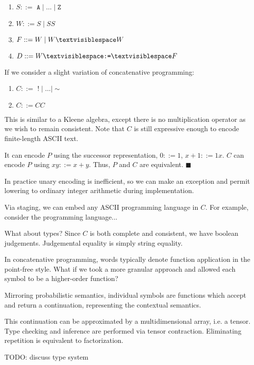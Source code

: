 \documentclass[11pt]{article}
\begin{document}
\begin{enumerate}
  \item $S ::= $ $\texttt{A} \mid \ldots \mid \texttt{Z}$
  \item $W ::= S \mid SS$
  \item $F ::= W \mid W \textvisiblespace W$
  \item $D ::= W \textvisiblespace\texttt{:=}\textvisiblespace F$
\end{enumerate}

If we consider a slight variation of concatenative programming:

\begin{enumerate}
  \item $C ::= $ $! \mid \ldots \mid \sim$
  \item $C ::= CC$
\end{enumerate}

This is similar to a Kleene algebra, except there is no multiplication operator as we wish to remain consistent. Note that $C$ is still expressive enough to encode finite-length ASCII text.

It can encode $P$ using the successor representation, $0 ::= 1$, $x+1 ::= 1x$. $C$ can encode $P$ using $xy ::= x+y$. Thus, $P$ and $C$ are equivalent. $\blacksquare$

In practice unary encoding is inefficient, so we can make an exception and permit lowering to ordinary integer arithmetic during implementation.

Via staging, we can embed any ASCII programming language in $C$. For example, consider the programming language...

What about types? Since $C$ is both complete and consistent, we have boolean judgements. Judgemental equality is simply string equality.

In concatenative programming, words typically denote function application in the point-free style. What if we took a more granular approach and allowed each symbol to be a higher-order function?

Mirroring probabilistic semantics, individual symbols are functions which accept and return a continuation, representing the contextual semantics.

This continuation can be approximated by a multidimensional array, i.e. a tensor. Type checking and inference are performed via tensor contraction. Eliminating repetition is equivalent to factorization.

TODO: discuss type system
\end{document}
